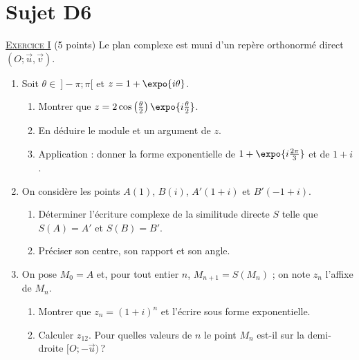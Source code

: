 \newpage
\section{Sujet D6}
\noindent \underline{\textsc{Exercice I}} (5 points) \newline
Le plan complexe est muni d'un rep\`ere orthonorm\'e direct $(O ; \vec{u}, \vec{v})$.
\begin{enumerate}
      \item Soit $\theta \in\ ]-\pi ; \pi[$ et $z = 1 + \expo{i\theta}$.
            \begin{enumerate}
            \item Montrer que $z = 2\cos\left(\frac{\theta}{2}\right) \expo{i\frac{\theta}{2}}$.
            \item En d\'eduire le module et un argument de $z$.
            \item Application : donner la forme exponentielle de $1 + \expo{i\frac{2\pi}{3}}$ et de $1 + i$.
            \end{enumerate}
      \item On consid\`ere les points $A(1)$, $B(i)$, $A'(1 + i)$ et $B'(-1 + i)$.
            \begin{enumerate}
            \item D\'eterminer l'\'ecriture complexe de la similitude directe $S$ telle que $S(A) = A'$ et $S(B) = B'$.
            \item Pr\'eciser son centre, son rapport et son angle.
            \end{enumerate}
      \item On pose $M_0 = A$ et, pour tout entier $n$, $M_{n+1} = S(M_n)$ ; on note $z_n$ l'affixe de $M_n$.
            \begin{enumerate}
            \item Montrer que $z_n = (1 + i)^n$ et l'\'ecrire sous forme exponentielle.
            \item Calculer $z_{12}$. Pour quelles valeurs de $n$ le point $M_n$ est-il sur la demi-droite $[O ; -\vec{u})$\,?
            \end{enumerate}
\end{enumerate}

